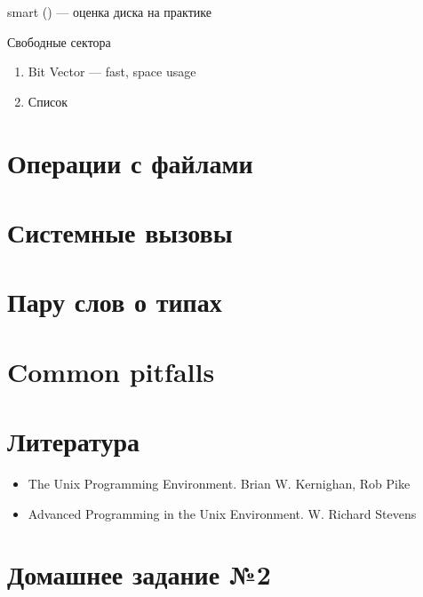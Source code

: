 \documentclass[../../lectures.tex]{subfiles}
\begin{document}
smart () --- оценка диска на практике

Свободные сектора
\begin{enumerate}
    \item Bit Vector --- fast, space usage
    \item Список
\end{enumerate}

\section{Операции с файлами}

\section{Системные вызовы}

\section{Пару слов о типах}

\section{Common pitfalls}

\section{Литература}
\begin{itemize}
    \item The Unix Programming Environment. Brian W. Kernighan, Rob Pike
    \item Advanced Programming in the Unix Environment. W. Richard Stevens
\end{itemize}

\section{Домашнее задание №2}
\end{document}
